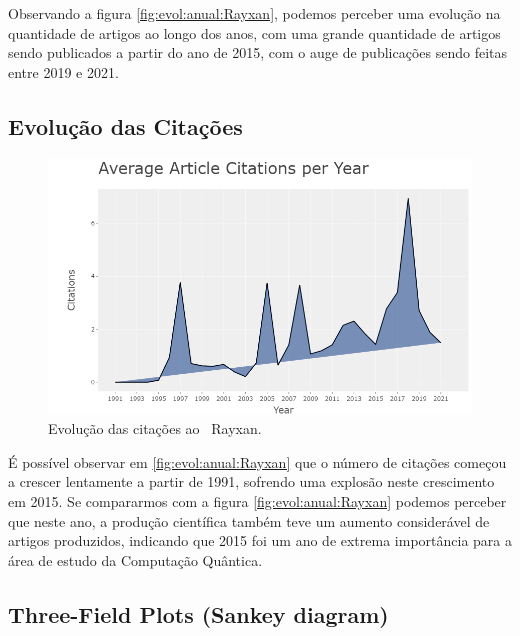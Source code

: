 Observando a figura \ref{fig:evol:anual:Rayxan}, podemos perceber uma evolução na quantidade de artigos ao longo dos anos, com uma grande quantidade de artigos sendo publicados a partir do ano de 2015, com o auge de publicações sendo feitas entre 2019 e 2021.

\subsection{Evolução das Citações}

\begin{figure}
    \centering
    \includegraphics[width=1\textwidth]{experiments/Rayxan/PesqBibliogr/ComputacaoQuantica/WoS-20220206/AverageCitations.png}
    \caption{Evolução das citações ao \dataset\   Rayxan.}
    \label{fig:cit:anual:Rayxan}
\end{figure}

É possível observar em \ref{fig:evol:anual:Rayxan} que o número de citações começou a crescer lentamente a partir de 1991, sofrendo uma explosão neste crescimento em 2015. Se compararmos com a figura \ref{fig:evol:anual:Rayxan} podemos perceber que neste ano, a produção científica também teve um aumento considerável de artigos produzidos, indicando que 2015 foi um ano de extrema importância para a área de estudo da Computação Quântica.

\subsection{Three-Field Plots (Sankey diagram)}

